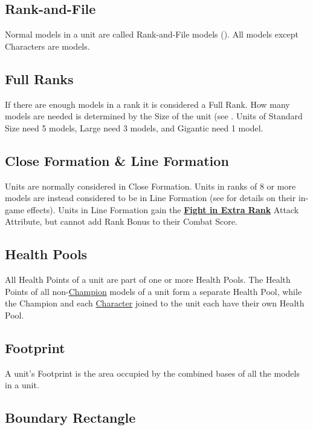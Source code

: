 \subsection{Rank-and-File}
\label{rank_and_file}

Normal models in a unit are called Rank-and-File models (\rnf{}). All models except Characters are \rnf{} models.

\subsection{Full Ranks}
\label{full_ranks}

If there are enough models in a rank it is considered a Full Rank. How many models are needed is determined by the Size of the unit (see . Units of Standard Size need 5 models, Large need 3 models, and Gigantic need 1 model.

\subsection{Close Formation \&{} Line Formation}
\label{line_formation}

Units are normally considered in Close Formation. Units in ranks of 8 or more models are instead considered to be in Line Formation (see  for details on their in-game effects). Units in Line Formation gain the \hyperref[fight_in_extra_rank]{\textbf{Fight in Extra Rank}} Attack Attribute, but cannot add Rank Bonus to their Combat Score.

\subsection{Health Pools}
\label{health_pools}

All Health Points of a unit are part of one or more Health Pools. The Health Points of all non-\hyperref[champion]{Champion} \rnf{} models of a unit form a separate Health Pool, while the Champion and each \hyperref[characters]{Character} joined to the unit each have their own Health Pool.

\subsection{Footprint}
\label{footprint}

A unit's Footprint is the area occupied by the combined bases of all the models in a unit.

\subsection{Boundary Rectangle}
\label{boundary_rectangle}

